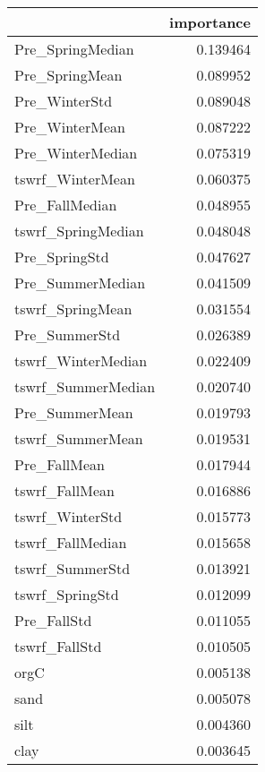 \begin{tabular}{lr}
\toprule
 & importance \\
\midrule
Pre_SpringMedian & 0.139464 \\
Pre_SpringMean & 0.089952 \\
Pre_WinterStd & 0.089048 \\
Pre_WinterMean & 0.087222 \\
Pre_WinterMedian & 0.075319 \\
tswrf_WinterMean & 0.060375 \\
Pre_FallMedian & 0.048955 \\
tswrf_SpringMedian & 0.048048 \\
Pre_SpringStd & 0.047627 \\
Pre_SummerMedian & 0.041509 \\
tswrf_SpringMean & 0.031554 \\
Pre_SummerStd & 0.026389 \\
tswrf_WinterMedian & 0.022409 \\
tswrf_SummerMedian & 0.020740 \\
Pre_SummerMean & 0.019793 \\
tswrf_SummerMean & 0.019531 \\
Pre_FallMean & 0.017944 \\
tswrf_FallMean & 0.016886 \\
tswrf_WinterStd & 0.015773 \\
tswrf_FallMedian & 0.015658 \\
tswrf_SummerStd & 0.013921 \\
tswrf_SpringStd & 0.012099 \\
Pre_FallStd & 0.011055 \\
tswrf_FallStd & 0.010505 \\
orgC & 0.005138 \\
sand & 0.005078 \\
silt & 0.004360 \\
clay & 0.003645 \\
\bottomrule
\end{tabular}
